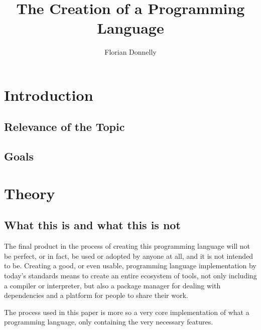 \documentclass[12pt,a4paper,man]{apa7}
\author{Florian Donnelly}
\title{The Creation of a Programming Language}
\begin{document}
\onehalfspacing
\maketitle\tableofcontents\newpage

\newcommand{\name}{\emph{TestScript }}

\section{Introduction}
\subsection{Relevance of the Topic}
\subsection{Goals}

\section{Theory}
\subsection{What this is and what this is not}
The final product in the process of creating this programming language will 
not be perfect, or in fact, be used or adopted by anyone at all, and it is not
intended to be. Creating a good, or even usable, programming language 
implementation by today's  standards means to create an entire ecosystem of 
tools, not only including a compiler or interpreter, but also a package manager
for dealing with dependencies and a platform for people to share their work.

The process used in this paper is more so a very core implementation of what
a programming language, only containing the very necessary features.
\end{document}
